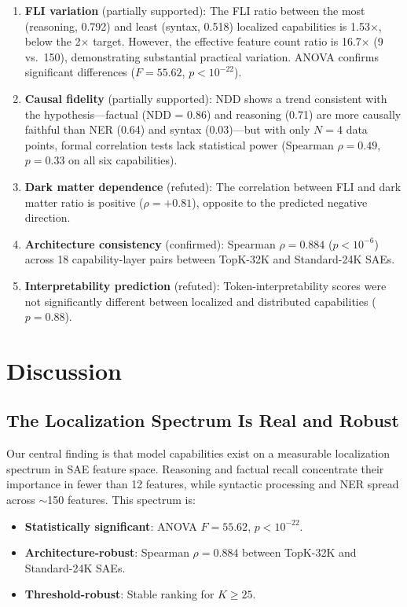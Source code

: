 \documentclass{article}
\begin{document}
\begin{enumerate}
    \item \textbf{FLI variation} (partially supported): The FLI ratio between the most (reasoning, 0.792) and least (syntax, 0.518) localized capabilities is 1.53$\times$, below the 2$\times$ target. However, the effective feature count ratio is 16.7$\times$ (9 vs.\ 150), demonstrating substantial practical variation. ANOVA confirms significant differences ($F = 55.62$, $p < 10^{-22}$).
    \item \textbf{Causal fidelity} (partially supported): NDD shows a trend consistent with the hypothesis---factual (NDD = 0.86) and reasoning (0.71) are more causally faithful than NER (0.64) and syntax (0.03)---but with only $N = 4$ data points, formal correlation tests lack statistical power (Spearman $\rho = 0.49$, $p = 0.33$ on all six capabilities).
    \item \textbf{Dark matter dependence} (refuted): The correlation between FLI and dark matter ratio is positive ($\rho = +0.81$), opposite to the predicted negative direction.
    \item \textbf{Architecture consistency} (confirmed): Spearman $\rho = 0.884$ ($p < 10^{-6}$) across 18 capability-layer pairs between TopK-32K and Standard-24K SAEs.
    \item \textbf{Interpretability prediction} (refuted): Token-interpretability scores were not significantly different between localized and distributed capabilities ($p = 0.88$).
\end{enumerate}

\section{Discussion}
\label{sec:discussion}

\subsection{The Localization Spectrum Is Real and Robust}
\label{sec:discussion_spectrum}

Our central finding is that model capabilities exist on a measurable localization spectrum in SAE feature space. Reasoning and factual recall concentrate their importance in fewer than 12 features, while syntactic processing and NER spread across $\sim$150 features. This spectrum is:
\begin{itemize}
    \item \textbf{Statistically significant}: ANOVA $F = 55.62$, $p < 10^{-22}$.
    \item \textbf{Architecture-robust}: Spearman $\rho = 0.884$ between TopK-32K and Standard-24K SAEs.
    \item \textbf{Threshold-robust}: Stable ranking for $K \geq 25$.
\end{itemize}
\end{document}
